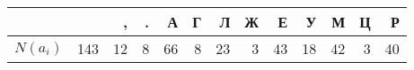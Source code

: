 \begin{tabular}{lrrrrrrrrrrrr}
\toprule
 &   & , & . & А & Г & Л & Ж & Е & У & М & Ц & Р \\
\midrule
$N(a_i)$ & 143 & 12 & 8 & 66 & 8 & 23 & 3 & 43 & 18 & 42 & 3 & 40 \\
\bottomrule
\end{tabular}
